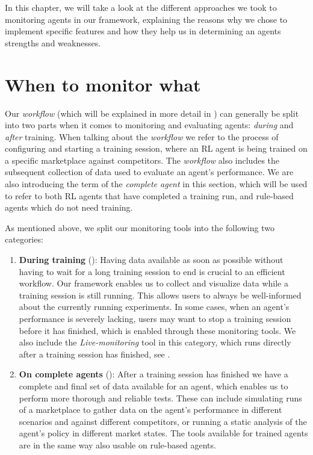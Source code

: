 \begin{jointwork}\label{ch:Approaches}
	In this chapter, we will take a look at the different approaches we took to monitoring agents in our framework, explaining the reasons why we chose to implement specific features and how they help us in determining an agents strengths and weaknesses.
\end{jointwork}

\section{When to monitor what}\label{sec:WhenToMonitorWhat}

Our \emph{workflow} (which will be explained in more detail in ) can generally be split into two parts when it comes to monitoring and evaluating agents: \emph{during} and \emph{after} training. When talking about the \emph{workflow} we refer to the process of configuring and starting a training session, where an RL agent is being trained on a specific marketplace against competitors. The \emph{workflow} also includes the subsequent collection of data used to evaluate an agent's performance. We are also introducing the term of the \emph{complete agent} in this section, which will be used to refer to both RL agents that have completed a training run, and rule-based agents which do not need training.

As mentioned above, we split our monitoring tools into the following two categories:

\begin{enumerate}
	\item \textbf{During training} (): Having data available as soon as possible without having to wait for a long training session to end is crucial to an efficient workflow. Our framework enables us to collect and visualize data while a training session is still running. This allows users to always be well-informed about the currently running experiments. In some cases, when an agent's performance is severely lacking, users may want to stop a training session before it has finished, which is enabled through these monitoring tools. We also include the \emph{Live-monitoring} tool in this category, which runs directly after a training session has finished, see .

	\item \textbf{On complete agents} (): After a training session has finished we have a complete and final set of data available for an agent, which enables us to perform more thorough and reliable tests. These can include simulating runs of a marketplace to gather data on the agent's performance in different scenarios and against different competitors, or running a static analysis of the agent's policy in different market states. The tools available for trained agents are in the same way also usable on rule-based agents.
\end{enumerate}

